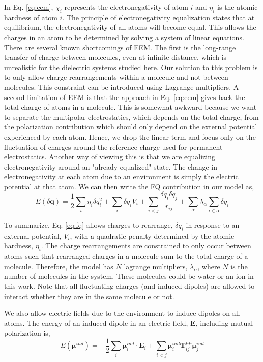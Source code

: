 \documentclass[journal=jacsat,manuscript=article]{achemso}
\begin{document}
In Eq. \ref{eq:eem}, $\chi_i$ represents the electronegativity of atom $i$ and
$\eta_i$ is the atomic hardness of atom $i$. The principle of electronegativity
equalization states that  at equilibrium, the electronegativity of all atoms
will become equal. This allows the charges in an atom to be determined by solving
a system of linear equations. There are several known shortcomings of EEM. The first
is the long-range transfer of charge between molecules, even at infinite distance,
which is unrealistic for the dielectric systems studied here.\cite{chen2007qtpie,chen2008unified}
Our solution to this problem is to only allow charge rearrangements within
a molecule and not between molecules. This constraint can be introduced using
Lagrange multipliers. A second limitation of EEM is that the approach in Eq. \ref{eq:eem}
gives back the total charge of atoms in a molecule. This is somewhat awkward because
we want to separate the multipolar electrostatics, which depends on the total charge,
from the polarization contribution which should only depend on the external potential
experienced by each atom. Hence, we drop the linear term and focus only on the
fluctuation of charges around the reference charge used for permanent electrostatics.
Another way of viewing this is that we are equalizing electronegativity around an "already
equalized" state. The change in electronegativity at each atom due to an environment is simply
the electric potential at that atom. We can then write the FQ contribution in our
model as,
\begin{equation}
  E(\delta \bm{q})=\frac12\sum_i \eta_i \delta q_i^2 + \sum_i \delta q_i V_i + \sum_{i<j}\frac{\delta q_i \delta q_j}{r_{ij}} + \sum_{\alpha}\lambda_\alpha \sum_{i\in\alpha}\delta q_{i}
  \label{eq:fq}
\end{equation}

To summarize, Eq. \ref{eq:fq} allows charges to rearrange, $\delta q_i$ in response to an external
potential, $V_i$, with a quadratic penalty determined by the atomic hardness, $\eta_i$.
The charge rearrangements are constrained to only occur between atoms such that rearranged
charges in a molecule sum to the total charge of a molecule. Therefore, the model has $N$ lagrange
multipliers, $\lambda_\alpha$, where $N$ is the number of molecules in the system. These molecules
could be water or an ion in this work. Note that all fluctuating charges (and induced
dipoles) are allowed to interact whether they are in the same molecule or not.

We also allow electric fields due to the environment to induce dipoles on all atoms.
The energy of an induced dipole in an electric field, $\bm{E}$, including mutual polarization is,
\begin{equation}
  E(\bm{\mu}^{ind})=-\frac12\sum_i \bm{\mu}_i^{ind}\cdot \bm{E}_i + \sum_{i<j}\bm{\mu}^{ind}_i \bm{T}^{\mu\mu}_{ij}\bm{\mu}^{ind}_j
  \label{eq:induced_dipoles}
\end{equation}
\end{document}
